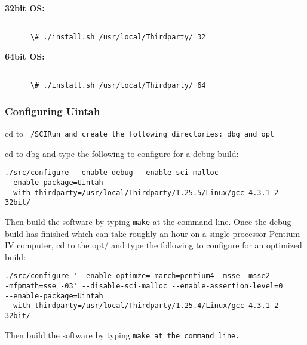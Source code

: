 \textbf{32bit OS:}

\begin{Verbatim}[fontsize=\footnotesize]

      \# ./install.sh /usr/local/Thirdparty/ 32

\end{Verbatim}

\textbf{64bit OS:}


\begin{Verbatim}[fontsize=\footnotesize]

      \# ./install.sh /usr/local/Thirdparty/ 64

\end{Verbatim}


\subsubsection{Configuring Uintah}

cd to \tt ~/SCIRun \normalfont and create the following directories: dbg and opt

cd to dbg and type the following to configure for a debug build:

\begin{Verbatim}[fontsize=\footnotesize]
./src/configure --enable-debug --enable-sci-malloc 
--enable-package=Uintah 
--with-thirdparty=/usr/local/Thirdparty/1.25.5/Linux/gcc-4.3.1-2-32bit/
\end{Verbatim}

Then build the software by typing \texttt{make} at the command
line. Once the debug build has finished which can take roughly an hour
on a single processor Pentium IV computer, cd to the opt/ and type the
following to configure for an optimized build:

\begin{Verbatim}[fontsize=\footnotesize]
./src/configure '--enable-optimze=-march=pentium4 -msse -msse2 
-mfpmath=sse -03' --disable-sci-malloc --enable-assertion-level=0 
--enable-package=Uintah 
--with-thirdparty=/usr/local/Thirdparty/1.25.4/Linux/gcc-4.3.1-2-32bit/
\end{Verbatim}

Then build the software by typing \tt make \normalfont at the command line.


